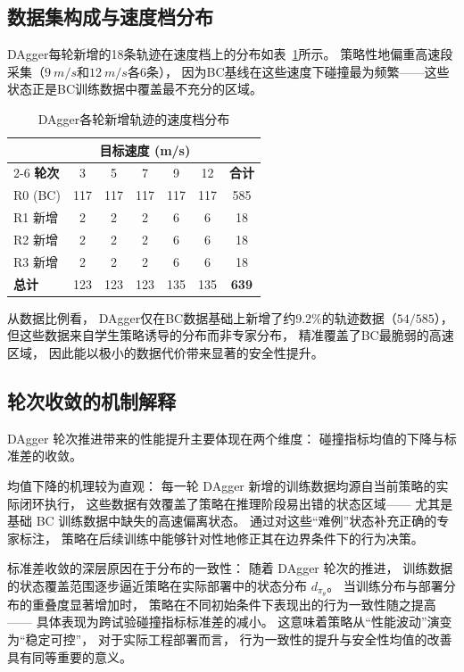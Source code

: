 \subsection{数据集构成与速度档分布}

DAgger每轮新增的18条轨迹在速度档上的分布如表~\ref{tab:dagger_speed_dist}所示。
策略性地偏重高速段采集（$\SI{9}{m/s}$和$\SI{12}{m/s}$各6条），
因为BC基线在这些速度下碰撞最为频繁——这些状态正是BC训练数据中覆盖最不充分的区域。

\begin{table}[htbp]
\centering
\caption{DAgger各轮新增轨迹的速度档分布}
\label{tab:dagger_speed_dist}
\begin{tabular}{lccccc|c}
\toprule
 & \multicolumn{5}{c|}{\textbf{目标速度 (m/s)}} & \\
\cmidrule(lr){2-6}
\textbf{轮次} & 3 & 5 & 7 & 9 & 12 & \textbf{合计} \\
\midrule
R0 (BC) & 117 & 117 & 117 & 117 & 117 & 585 \\
R1 新增 & 2 & 2 & 2 & 6 & 6 & 18 \\
R2 新增 & 2 & 2 & 2 & 6 & 6 & 18 \\
R3 新增 & 2 & 2 & 2 & 6 & 6 & 18 \\
\midrule
\textbf{总计} & 123 & 123 & 123 & 135 & 135 & \textbf{639} \\
\bottomrule
\end{tabular}
\end{table}

从数据比例看，
DAgger仅在BC数据基础上新增了约9.2\%的轨迹数据（$54/585$），
但这些数据来自学生策略诱导的分布而非专家分布，
精准覆盖了BC最脆弱的高速区域，
因此能以极小的数据代价带来显著的安全性提升。

\subsection{轮次收敛的机制解释}

DAgger 轮次推进带来的性能提升主要体现在两个维度：
碰撞指标均值的下降与标准差的收敛。

均值下降的机理较为直观：
每一轮 DAgger 新增的训练数据均源自当前策略的实际闭环执行，
这些数据有效覆盖了策略在推理阶段易出错的状态区域——
尤其是基础 BC 训练数据中缺失的高速偏离状态。
通过对这些``难例''状态补充正确的专家标注，
策略在后续训练中能够针对性地修正其在边界条件下的行为决策。

标准差收敛的深层原因在于分布的一致性：
随着 DAgger 轮次的推进，
训练数据的状态覆盖范围逐步逼近策略在实际部署中的状态分布 $d_{\pi_\theta}$。
当训练分布与部署分布的重叠度显著增加时，
策略在不同初始条件下表现出的行为一致性随之提高——
具体表现为跨试验碰撞指标标准差的减小。
这意味着策略从``性能波动''演变为``稳定可控''，
对于实际工程部署而言，
行为一致性的提升与安全性均值的改善具有同等重要的意义。

